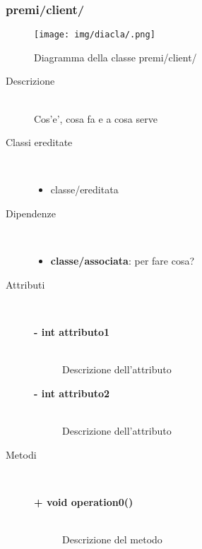 \subsubsection{premi/client/}
\begin{figure}[h]
\begin{center}
\texttt{[image: img/diacla/.png]}
\caption{Diagramma della classe premi/client/}
\end{center}
\end{figure}




\begin{description}
\item[Descrizione] \hfill \\
	Cos'e', cosa fa e a cosa serve
	
	
\item[Classi ereditate] \hfill \\
	\begin{itemize}
		\item classe/ereditata
	\end{itemize}
	
	
\item[Dipendenze] \hfill \\
	\begin{itemize}
		\item \textbf{classe/associata}: per fare cosa?
	\end{itemize}
	
	
\item[Attributi] \hfill \\
	\begin{description}
		\item[\textbf{- int attributo1			}] \hfill \\
			Descrizione dell'attributo
		\item[\textbf{- int attributo2			}] \hfill \\
			Descrizione dell'attributo
	\end{description}
	
	
\item[Metodi] \hfill \\

	\begin{description}
		\item[\textbf{\color{blue}+ void operation0()			}] \hfill \\
			Descrizione del metodo
			

\end{description}
\end{description}
